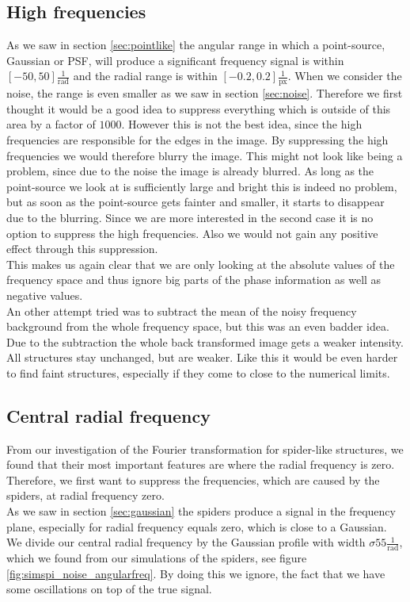 \subsection{High frequencies}
As we saw in section \ref{sec:pointlike} the angular range in which a point-source, Gaussian or PSF, will produce a significant frequency signal is within $[-50, 50] \frac{1}{\mathrm{rad}}$ and the radial range is within $[-0.2, 0.2] \frac{1}{\mathrm{px}}$. When we consider the noise, the range is even smaller as we saw in section \ref{sec:noise}.  
Therefore we first thought it would be a good idea to suppress everything which is outside of this area by a factor of $1000$. However this is not the best idea, since the high frequencies are responsible for the edges in the image. By suppressing the high frequencies we would therefore blurry the image. This might not look like being a problem, since due to the noise the image is already blurred. As long as the point-source we look at is sufficiently large and bright this is indeed no problem, but as soon as the point-source gets fainter and smaller, it starts to disappear due to the blurring. Since we are more interested in the second case it is no option to suppress the high frequencies. Also we would not gain any positive effect through this suppression.\\
This makes us again clear that we are only looking at the absolute values of the frequency space and thus ignore big parts of the phase information as well as negative values.\\
An other attempt tried was to subtract the mean of the noisy frequency background from the whole frequency space, but this was an even badder idea. Due to the subtraction the whole back transformed image gets a weaker intensity. All structures stay unchanged, but are weaker. Like this it would be even harder to find faint structures, especially if they come to close to the numerical limits. 

\subsection{Central radial frequency}
From our investigation of the Fourier transformation for spider-like structures, we found that their most important features are where the radial frequency is zero. Therefore, we first want to suppress the frequencies, which are caused by the spiders, at radial frequency zero.\\
As we saw in section \ref{sec:gaussian} the spiders produce a signal in the frequency plane, especially for radial frequency equals zero, which is close to a Gaussian. We divide our central radial frequency by the Gaussian profile with width $\sigma 55 \frac{1}{\mathrm{rad}}$, which we found from our simulations of the spiders, see figure \ref{fig:simspi_noise_angularfreq}. By doing this we ignore, the fact that we have some oscillations on top of the true signal.  
 

